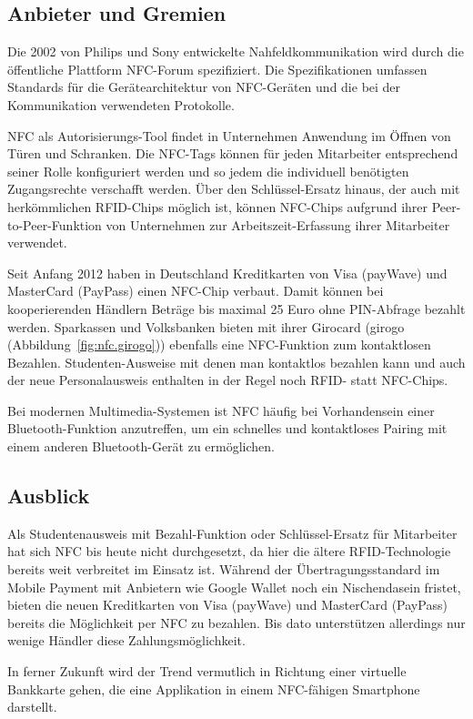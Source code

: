\begin{multicols}{3}

\subsection*{Anbieter und Gremien}
Die 2002 von Philips und Sony entwickelte Nahfeldkommunikation wird durch die öffentliche Plattform NFC-Forum spezifiziert. Die Spezifikationen umfassen Standards für die Gerätearchitektur von NFC-Geräten und die bei der Kommunikation verwendeten Protokolle.

NFC als Autorisierungs-Tool findet in Unternehmen Anwendung im Öffnen von Türen und Schranken. Die NFC-Tags können für jeden Mitarbeiter entsprechend seiner Rolle konfiguriert werden und so jedem die individuell benötigten Zugangsrechte verschafft werden. Über den Schlüssel-Ersatz hinaus, der auch mit herkömmlichen RFID-Chips möglich ist, können NFC-Chips aufgrund ihrer Peer-to-Peer-Funktion von Unternehmen zur Arbeitszeit-Erfassung ihrer Mitarbeiter verwendet.

Seit Anfang 2012 haben in Deutschland Kreditkarten von Visa (payWave) und MasterCard (PayPass) einen NFC-Chip verbaut. Damit können bei kooperierenden Händlern Beträge bis maximal 25 Euro ohne PIN-Abfrage bezahlt werden. Sparkassen und Volksbanken bieten mit ihrer Girocard (girogo (Abbildung~\ref{fig:nfc.girogo})) ebenfalls eine NFC-Funktion zum kontaktlosen Bezahlen.
Studenten-Ausweise mit denen man kontaktlos bezahlen kann und auch der neue Personalausweis enthalten in der Regel noch RFID- statt NFC-Chips.

Bei modernen Multimedia-Systemen ist NFC häufig bei Vorhandensein einer Bluetooth-Funktion anzutreffen, um ein schnelles und kontaktloses Pairing mit einem anderen Bluetooth-Gerät zu ermöglichen.~\cite{nfc.2,nfc.11,nfc.12}


\subsection*{Ausblick}
Als Studentenausweis mit Bezahl-Funktion oder Schlüssel-Ersatz für Mitarbeiter hat sich NFC bis heute nicht durchgesetzt, da hier die ältere RFID-Technologie bereits weit verbreitet im Einsatz ist. Während der Übertragungsstandard im Mobile Payment mit Anbietern wie Google Wallet noch ein Nischendasein fristet, bieten die neuen Kreditkarten von Visa (payWave) und MasterCard (PayPass) bereits die Möglichkeit per NFC zu bezahlen. Bis dato unterstützen allerdings nur wenige Händler diese Zahlungsmöglichkeit.

In ferner Zukunft wird der Trend vermutlich in Richtung einer virtuelle Bankkarte gehen, die eine Applikation in einem NFC-fähigen Smartphone darstellt.~\cite{nfc.2}




\printbibliography[segment=12,heading=subbibliography]

\end{multicols}
\newpage
